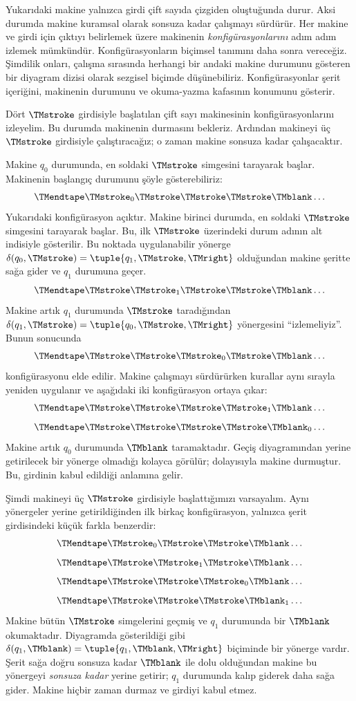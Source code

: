 \begin{explain}
Yukarıdaki makine yalnızca girdi çift sayıda çizgiden oluştuğunda durur.
Aksi durumda makine kuramsal olarak sonsuza kadar çalışmayı sürdürür. Her
makine ve girdi için çıktıyı belirlemek üzere makinenin
\emph{konfigürasyonlarını} adım adım izlemek mümkündür. Konfigürasyonların
biçimsel tanımını daha sonra vereceğiz. Şimdilik onları, çalışma sırasında
herhangi bir andaki makine durumunu gösteren bir diyagram dizisi olarak
sezgisel biçimde düşünebiliriz. Konfigürasyonlar şerit içeriğini, makinenin
durumunu ve okuma-yazma kafasının konumunu gösterir.

Dört $\TMstroke$ girdisiyle başlatılan çift sayı makinesinin
konfigürasyonlarını izleyelim. Bu durumda makinenin durmasını bekleriz.
Ardından makineyi üç $\TMstroke$ girdisiyle çalıştıracağız; o zaman makine
sonsuza kadar çalışacaktır.

Makine $q_0$ durumunda, en soldaki $\TMstroke$ simgesini tarayarak başlar.
Makinenin başlangıç durumunu şöyle gösterebiliriz:
\[
\TMendtape \TMstroke_0 \TMstroke \TMstroke \TMstroke \TMblank \ldots
\]
Yukarıdaki konfigürasyon açıktır. Makine birinci durumda, en soldaki
$\TMstroke$ simgesini tarayarak başlar. Bu, ilk $\TMstroke$ üzerindeki durum
adının alt indisiyle gösterilir. Bu noktada uygulanabilir yönerge
$\delta(q_0,\TMstroke)=\tuple{q_1,\TMstroke,\TMright}$ olduğundan makine
şeritte sağa gider ve $q_1$ durumuna geçer.
\[
\TMendtape \TMstroke \TMstroke_1 \TMstroke \TMstroke \TMblank \ldots
\]
Makine artık $q_1$ durumunda $\TMstroke$ taradığından
$\delta(q_1,\TMstroke)=\tuple{q_0,\TMstroke,\TMright}$ yönergesini
``izlemeliyiz''. Bunun sonucunda
\[
\TMendtape \TMstroke \TMstroke \TMstroke_0 \TMstroke \TMblank \ldots
\]
konfigürasyonu elde edilir. Makine çalışmayı sürdürürken kurallar aynı sırayla
yeniden uygulanır ve aşağıdaki iki konfigürasyon ortaya çıkar:
\[
\TMendtape \TMstroke \TMstroke \TMstroke \TMstroke_1 \TMblank \ldots
\]
\[
\TMendtape \TMstroke \TMstroke \TMstroke \TMstroke \TMblank_0 \ldots
\]
Makine artık $q_0$ durumunda $\TMblank$ taramaktadır. Geçiş diyagramından
yerine getirilecek bir yönerge olmadığı kolayca görülür; dolayısıyla makine
durmuştur. Bu, girdinin kabul edildiği anlamına gelir.

Şimdi makineyi üç $\TMstroke$ girdisiyle başlattığımızı varsayalım. Aynı
yönergeler yerine getirildiğinden ilk birkaç konfigürasyon, yalnızca şerit
girdisindeki küçük farkla benzerdir:
\[
\TMendtape \TMstroke_0 \TMstroke \TMstroke \TMblank \ldots
\]
\[
\TMendtape \TMstroke \TMstroke_1 \TMstroke \TMblank \ldots
\]
\[
\TMendtape \TMstroke \TMstroke \TMstroke_0 \TMblank \ldots
\]
\[
\TMendtape \TMstroke \TMstroke \TMstroke \TMblank_1 \ldots
\]
Makine bütün $\TMstroke$ simgelerini geçmiş ve $q_1$ durumunda bir
$\TMblank$ okumaktadır. Diyagramda gösterildiği gibi
$\delta(q_1,\TMblank)=\tuple{q_1,\TMblank,\TMright}$ biçiminde bir yönerge
vardır. Şerit sağa doğru sonsuza kadar $\TMblank$ ile dolu olduğundan makine
bu yönergeyi \emph{sonsuza kadar} yerine getirir; $q_1$ durumunda kalıp
giderek daha sağa gider. Makine hiçbir zaman durmaz ve girdiyi kabul etmez.
\end{explain}

